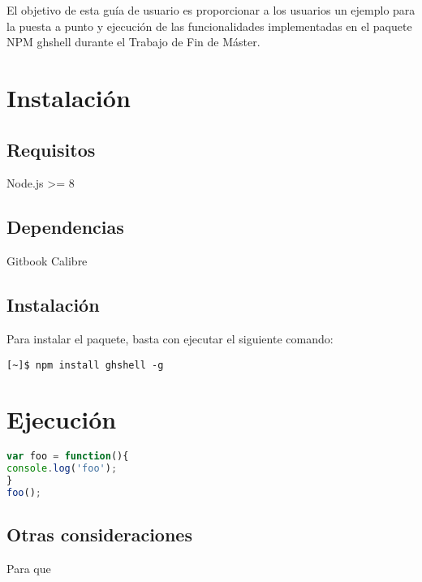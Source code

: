 El objetivo de esta guía de usuario es proporcionar a los usuarios un ejemplo para la puesta a punto y ejecución de las 
funcionalidades implementadas en el paquete NPM ghshell durante el Trabajo de Fin de Máster.

\section{Instalación}
\label{Apendice2:instalacion}

\subsection{Requisitos}
\label{subsec:b.1.1}

Node.js \textgreater = 8

\subsection{Dependencias}
\label{subsec:b.1.2}

Gitbook
Calibre

\subsection{Instalación}
\label{subsec:b.1.3}

Para instalar el paquete, basta con ejecutar el siguiente comando:
\begin{verbatim}
[~]$ npm install ghshell -g
\end{verbatim}


\section{Ejecución}
\label{Apendice2:ejecucion}

\begin{lstlisting}[language=JavaScript]
var foo = function(){
console.log('foo');
}
foo();
\end{lstlisting}
\bigskip

\subsection{Otras consideraciones}
\label{subsec:Apendice2.1}

Para que